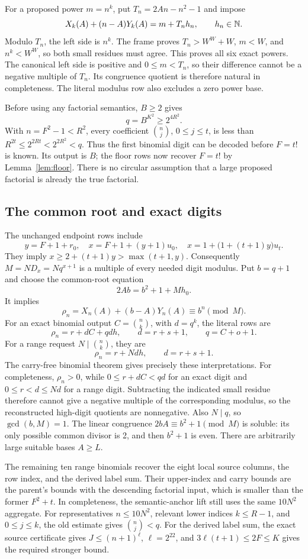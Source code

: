 For a proposed power \(m=n^k\), put
\(T_n=2An-n^2-1\) and impose
\[
 X_k(A)+(n-A)Y_k(A)=m+T_n h_n,\qquad h_n\in\mathbb N.
\]
Modulo \(T_n\), the left side is \(n^k\). The frame proves
\(T_n>W^W+W\), \(m<W\), and \(n^k<W^W\), so both small
residues must agree. This proves all six exact powers. The canonical
left side is positive and \(0\le m<T_n\), so their difference cannot
be a negative multiple of \(T_n\). Its congruence quotient is therefore
natural in completeness. The literal modulus row also excludes a zero
power base.

Before using any factorial semantics, \(B\ge2\) gives
\[
 q=B^{K^2}\ge2^{4R^2}.
\]
With \(n=F^2-1<R^2\), every coefficient \(\binom nj\),
\(0\le j\le t\), is less than
\(R^{2t}\le2^{2Rt}<2^{2R^2}<q\). Thus the first binomial digit
can be decoded before \(F=t!\) is known. Its output is \(B\);
the floor rows now recover \(F=t!\) by Lemma~\ref{lem:floor}.
There is no circular assumption that a large proposed factorial is
already the true factorial.

\subsection{The common root and exact digits}

The unchanged endpoint rows include
\[
 y=F+1+r_0,\quad
 x=F+1+(y+1)u_0,\quad
 x=1+\bigl(1+(t+1)y\bigr)u_t.
\]
They imply \(x\ge2+(t+1)y>\max(t+1,y)\). Consequently
\(M=ND_x=Nq^{x+1}\) is a multiple of every needed digit modulus.
Put \(b=q+1\) and choose the common-root equation
\[
 2Ab=b^2+1+M h_0.
\]
It implies
\[
 \rho_n=X_n(A)+(b-A)Y_n(A)\equiv b^n\pmod M.
\]
For an exact binomial output \(C=\binom nk\), with \(d=q^k\),
the literal rows are
\[
 \rho_n=r+dC+qd h,\qquad d=r+s+1,\qquad q=C+o+1.
\]
For a range request \(N\mid\binom nk\), they are
\[
 \rho_n=r+Nd h,\qquad d=r+s+1.
\]
The carry-free binomial theorem gives precisely these interpretations.
For completeness, \(\rho_n>0\), while \(0\le r+dC<qd\) for an
exact digit and \(0\le r<d\le Nd\) for a range digit. Subtracting
the indicated small residue therefore cannot give a negative multiple
of the corresponding modulus, so the reconstructed high-digit
quotients are nonnegative. Also \(N\mid q\), so \(\gcd(b,M)=1\).
The linear congruence \(2bA\equiv b^2+1\pmod M\) is soluble:
its only possible common divisor is 2, and then \(b^2+1\) is even.
There are arbitrarily large suitable bases \(A\ge L\).

The remaining ten range binomials recover the eight local source
columns, the row index, and the derived label sum. Their upper-index
and carry bounds are the parent's bounds with the descending factorial
input, which is smaller than the former \(F^2+t\). In completeness,
the semantic-anchor lift still uses the same \(10N^2\) aggregate.
For representatives \(n\le10N^2\), relevant lower indices
\(k\le R-1\), and \(0\le j\le k\), the old estimate gives
\(\binom nj<q\).
For the derived label sum, the exact source certificate gives
\(J\le(n+1)^{\ell}\), \(\ell=2^{22}\), and
\(3\ell(t+1)\le2F\le K\) gives the required stronger bound.

